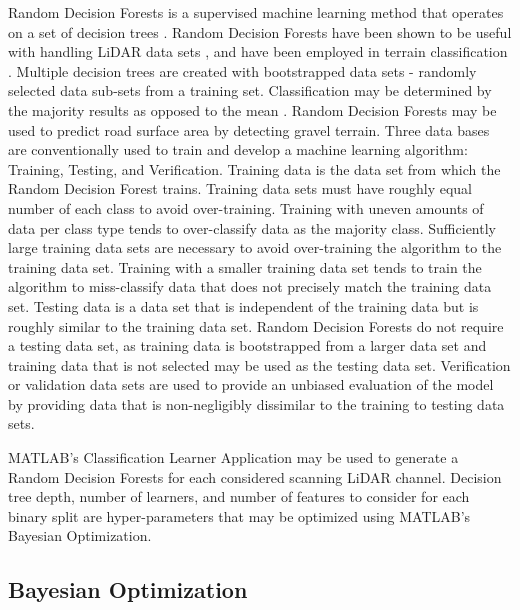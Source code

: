 \documentclass[numbered,pdftex]{ohio-etd}
\begin{document}
{{		{Random Decision Forests is a supervised machine learning method that operates on a set of decision trees \cite{ho_random_1995}. Random Decision Forests have been shown to be useful with handling LiDAR data sets \cite{breiman_random_2001}, and have been employed in terrain classification \cite{laible_3d_2012,laible_map_building,laible_terrain_2013,khan_high_2011,reymann_improving_2015,schilling_geometric_2017, wietrzykowski_context-aware_2019}. Multiple decision trees are created with bootstrapped data sets - randomly selected data sub-sets from a training set. Classification may be determined by the majority results as opposed to the mean \cite{breiman_random_2001,ho_random_1995}. Random Decision Forests may be used to predict road surface area by detecting gravel terrain. Three data bases are conventionally used to train and develop a machine learning algorithm: Training, Testing, and Verification. Training data is the data set from which the Random Decision Forest trains. Training data sets must have roughly equal number of each class to avoid over-training. Training with uneven amounts of data per class type tends to over-classify data as the majority class. Sufficiently large training data sets are necessary to avoid over-training the algorithm to the training data set. Training with a smaller training data set tends to train the algorithm to miss-classify data that does not precisely match the training data set. Testing data is a data set that is independent of the training data but is roughly similar to the training data set. Random Decision Forests do not require a testing data set, as training data is bootstrapped from a larger data set and training data that is not selected may be used as the testing data set. Verification or validation data sets are used to provide an unbiased evaluation of the model by providing data that is non-negligibly dissimilar to the training to testing data sets. } 
		
		{MATLAB's Classification Learner Application may be used to generate a Random Decision Forests for each considered scanning LiDAR channel. Decision tree depth, number of learners, and number of features to consider for each binary split are hyper-parameters that may be optimized using MATLAB's Bayesian Optimization.}
	
	} %

	\subsection{Bayesian Optimization}\label{Bayesian_Optimization}{
		
}}
\end{document}
